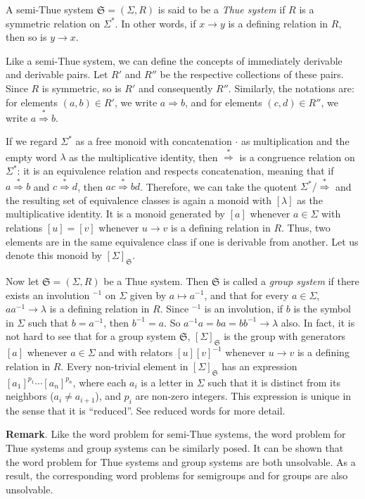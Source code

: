 \documentclass[12pt]{article}
\newcommand{\derive}{\stackrel{*}{\Rightarrow}}
\begin{document}
A semi-Thue system $\mathfrak{S}=(\Sigma,R)$ is said to be a \emph{Thue system} if $R$ is a symmetric relation on $\Sigma^*$.  In other words, if $x\to y$ is a defining relation in $R$, then so is $y\to x$.

Like a semi-Thue system, we can define the concepts of immediately derivable and derivable pairs.  Let $R'$ and $R''$ be the respective collections of these pairs.  Since $R$ is symmetric, so is $R'$ and consequently $R''$.  Similarly, the notations are: for elements $(a,b)\in R'$, we write $a\Rightarrow b$, and for elements $(c,d)\in R''$, we write $a\derive b$.

If we regard $\Sigma^*$ as a free monoid with concatenation $\cdot$ as multiplication and the empty word $\lambda$ as the multiplicative identity, then $\derive$ is a congruence relation on $\Sigma^*$: it is an equivalence relation and respects concatenation, meaning that if $a\derive b$ and $c\derive d$, then $ac\derive bd$.  Therefore, we can take the quotent $\Sigma^*/\derive$ and the resulting set of equivalence classes is again a monoid with $[\lambda]$ as the multiplicative identity.  It is a monoid generated by $[a]$ whenever $a\in \Sigma$ with relations $[u]=[v]$ whenever $u\to v$ is a defining relation in $R$.  Thus, two elements are in the same equivalence class if one is derivable from another.  Let us denote this monoid by $[\Sigma]_{\mathfrak{S}}$.

Now let $\mathfrak{S}=(\Sigma,R)$ be a Thue system.  Then $\mathfrak{S}$ is called a \emph{group system} if there exists an involution $^{-1}$ on $\Sigma$ given by $a\mapsto a^{-1}$, and that for every $a\in \Sigma$, $aa^{-1}\to \lambda$ is a defining relation in $R$.  Since $^{-1}$ is an involution, if $b$ is the symbol in $\Sigma$ such that $b=a^{-1}$, then $b^{-1}=a$.  So $a^{-1}a = ba= bb^{-1} \to \lambda$ also.  In fact, it is not hard to see that for a group system $\mathfrak{S}$, $[\Sigma]_{\mathfrak{S}}$ is the group with generators $[a]$ whenever $a\in \Sigma$ and with relators $[u][v]^{-1}$ whenever $u\to v$ is a defining relation in $R$.  Every non-trivial element in $[\Sigma]_{\mathfrak{S}}$ has an expression $[a_1]^{p_1}\cdots [a_n]^{p_n}$, where each $a_i$ is a letter in $\Sigma$ such that it is distinct from its neighbors ($a_i\ne a_{i+1}$), and $p_i$ are non-zero integers.  This expression is unique in the sense that it is ``reduced''.  See reduced words for more detail.

\textbf{Remark}.  Like the word problem for semi-Thue systems, the word problem for Thue systems and group systems can be similarly posed.  It can be shown that the word problem for Thue systems and group systems are both unsolvable.  As a result, the corresponding word problems for semigroups and for groups are also unsolvable.
\end{document}
